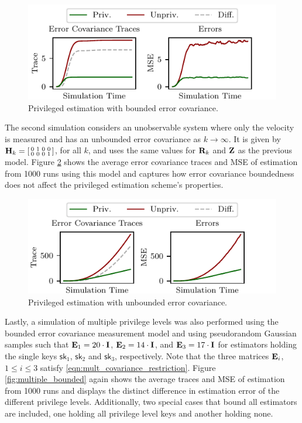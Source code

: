 \begin{figure}[htbp]
   \centering
   \includegraphics{figures/single_level_bounded.pdf}
   \caption{Privileged estimation with bounded error covariance.}
   \label{fig:single_bounded}
\end{figure}

The second simulation considers an unobservable system where only the velocity is measured and has an unbounded error covariance as $k \rightarrow \infty$. It is given by 
$
   {{\mathbf{H}}}_k=
   \begin{bsmallmatrix}
      0 & 1 & 0 & 0\\
      0 & 0 & 0 & 1
   \end{bsmallmatrix}
$, 
for all $k$, and uses the same values for ${{\mathbf{R}}}_k$ and ${{\mathbf{Z}}}$ as the previous model. Figure \ref{fig:single_unbounded} shows the average error covariance traces and MSE of estimation from 1000 runs using this model and captures how error covariance boundedness does not affect the privileged estimation scheme's properties.

\begin{figure}[htbp]
   \centering
   \includegraphics{figures/single_level_unbounded.pdf}
   \caption{Privileged estimation with unbounded error covariance.}
   \label{fig:single_unbounded}
\end{figure}

Lastly, a simulation of multiple privilege levels was also performed using the bounded error covariance measurement model and using pseudorandom Gaussian samples such that ${{\mathbf{E}}}_1=20 \cdot {\ensuremath{{\mathbf{I}}}}$, ${{\mathbf{E}}}_2=14 \cdot {\ensuremath{{\mathbf{I}}}}$, and ${{\mathbf{E}}}_3=17 \cdot {\ensuremath{{\mathbf{I}}}}$ for estimators holding the single keys $\mathsf{sk}_1$, $\mathsf{sk}_2$ and $\mathsf{sk}_3$, respectively. Note that the three matrices ${{\mathbf{E}}}_i$, $1 \leq i \leq 3$ satisfy \eqref{eqn:mult_covariance_restriction}. Figure \ref{fig:multiple_bounded} again shows the average traces and MSE of estimation from 1000 runs and displays the distinct difference in estimation error of the different privilege levels. Additionally, two special cases that bound all estimators are included, one holding all privilege level keys and another holding none.

